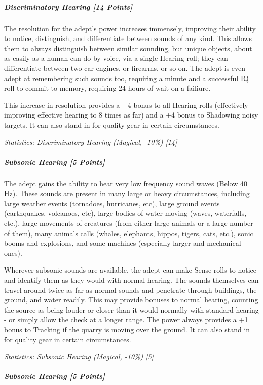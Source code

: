 \begin{multicols*}{3}
	\subparagraph{Discriminatory Hearing [14 Points]}
	
		The resolution for the adept's power increases immensely, improving their ability to notice, distinguish, and differentiate between sounds of any kind. This allows them to always distinguish between similar sounding, but unique objects, about as easily as a human can do by voice, via a single Hearing roll; they can differentiate between two car engines, or firearms, or so on. The adept is even adept at remembering such sounds too, requiring a minute and a successful IQ roll to commit to memory, requiring 24 hours of wait on a failiure.
		
		This increase in resolution provides a +4 bonus to all Hearing rolls (effectively improving effective hearing to 8 times as far) and a +4 bonus to Shadowing noisy targets. It can also stand in for quality gear in certain circumstances.
	
		\textcolor{OliveGreen}{\textit{Statistics: Discriminatory Hearing (Magical, -10\%) [14] }}
	
	\subparagraph{Subsonic Hearing [5 Points]}
	
		The adept gains the ability to hear very low frequency sound waves (Below 40 Hz). These sounds are present in many large or heavy circumstances, including large weather events (tornadoes, hurricanes, etc), large ground events (earthquakes, volcanoes, etc), large bodies of water moving (waves, waterfalls, etc.), large movements of creatures (from either large animals or a large number of them), many animals calls (whales, elephants, hippos, tigers, cats, etc.), sonic booms and explosions, and some machines (especially larger and mechanical ones). 
		
		Wherever subsonic sounds are available, the adept can make Sense rolls to notice and identify them as they would with normal hearing. The sounds themselves can travel around twice as far as normal sounds and penetrate through buildings, the ground, and water readily. This may provide bonuses to normal hearing, counting the source as being louder or closer than it would normally with standard hearing - or simply allow the check at a longer range. The power always provides a +1 bonus to Tracking if the quarry is moving over the ground. It can also stand in for quality gear in certain circumstances.
	
		\textcolor{OliveGreen}{\textit{Statistics: Subsonic Hearing (Magical, -10\%) [5] }}
	
	\subparagraph{Subsonic Hearing [5 Points]}
	

\end{multicols*}
